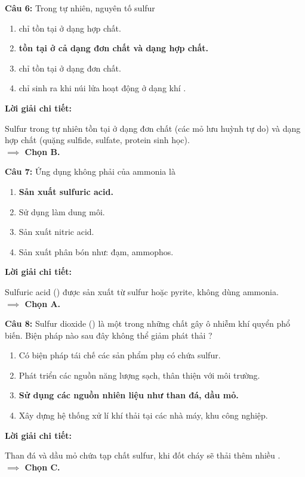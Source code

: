 \documentclass[10.5pt,a4paper]{article}
\newcommand{\loigiai}[1]{%
  \vspace{1pt}
  \begin{tcolorbox}
  {\color{myBlue}\bfseries Lời giải chi tiết:}\par\vspace{1pt}
  {\small #1}
  \end{tcolorbox}
  \vspace{2pt}
}
\begin{document}
\textbf{Câu 6:} Trong tự nhiên, nguyên tố sulfur
\begin{enumerate}[label=\textbf{\Alph*.}, itemsep=1pt, topsep=1pt, leftmargin=1.5cm]
    \item chỉ tồn tại ở dạng hợp chất. \hfill \item \textbf{\color{myRed}tồn tại ở cả dạng đơn chất và dạng hợp chất.}
    \item chỉ tồn tại ở dạng đơn chất. \hfill \item chỉ sinh ra khi núi lửa hoạt động ở dạng khí .
\end{enumerate}
\loigiai{Sulfur trong tự nhiên tồn tại ở dạng đơn chất (các mỏ lưu huỳnh tự do) và dạng hợp chất (quặng sulfide, sulfate, protein sinh học).\\ \textbf{$\implies$ Chọn B.}}

\textbf{Câu 7:} Ứng dụng không phải của ammonia là
\begin{enumerate}[label=\textbf{\Alph*.}, itemsep=1pt, topsep=1pt, leftmargin=1.5cm]
    \item \textbf{\color{myRed}Sản xuất sulfuric acid.} \hfill \item Sử dụng làm dung môi.
    \item Sản xuất nitric acid. \hfill \item Sản xuất phân bón như: đạm, ammophos.
\end{enumerate}
\loigiai{Sulfuric acid () được sản xuất từ sulfur hoặc pyrite, không dùng ammonia.\\ \textbf{$\implies$ Chọn A.}}

\textbf{Câu 8:} Sulfur dioxide () là một trong những chất gây ô nhiễm khí quyển phổ biến. Biện pháp nào sau đây không thể giảm phát thải ?
\begin{enumerate}[label=\textbf{\Alph*.}, itemsep=1pt, topsep=1pt, leftmargin=1.5cm]
    \item Có biện pháp tái chế các sản phẩm phụ có chứa sulfur.
    \item Phát triển các nguồn năng lượng sạch, thân thiện với môi trường.
    \item \textbf{\color{myRed}Sử dụng các nguồn nhiên liệu như than đá, dầu mỏ.}
    \item Xây dựng hệ thống xử lí khí thải tại các nhà máy, khu công nghiệp.
\end{enumerate}
\loigiai{Than đá và dầu mỏ chứa tạp chất sulfur, khi đốt cháy sẽ thải thêm nhiều \ce{SO2}.\\ \textbf{$\implies$ Chọn C.}}
\end{document}
